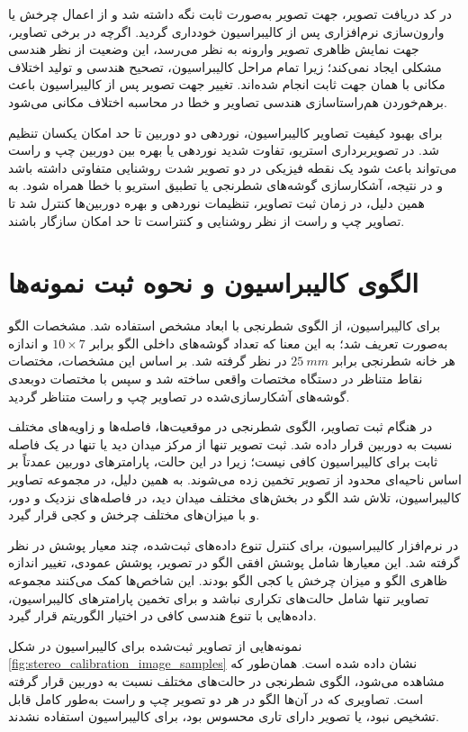 در کد دریافت تصویر، جهت تصویر به‌صورت ثابت نگه داشته شد و از اعمال چرخش یا وارون‌سازی نرم‌افزاری پس از کالیبراسیون خودداری گردید. اگرچه در برخی تصاویر، جهت نمایش ظاهری تصویر وارونه به نظر می‌رسد، این وضعیت از نظر هندسی مشکلی ایجاد نمی‌کند؛ زیرا تمام مراحل کالیبراسیون، تصحیح هندسی و تولید اختلاف مکانی با همان جهت ثابت انجام شده‌اند. تغییر جهت تصویر پس از کالیبراسیون باعث برهم‌خوردن هم‌راستاسازی هندسی تصاویر و خطا در محاسبه اختلاف مکانی می‌شود.

برای بهبود کیفیت تصاویر کالیبراسیون، نوردهی دو دوربین تا حد امکان یکسان تنظیم شد. در تصویربرداری استریو، تفاوت شدید نوردهی یا بهره بین دوربین چپ و راست می‌تواند باعث شود یک نقطه فیزیکی در دو تصویر شدت روشنایی متفاوتی داشته باشد و در نتیجه، آشکارسازی گوشه‌های شطرنجی یا تطبیق استریو با خطا همراه شود. به همین دلیل، در زمان ثبت تصاویر، تنظیمات نوردهی و بهره دوربین‌ها کنترل شد تا تصاویر چپ و راست از نظر روشنایی و کنتراست تا حد امکان سازگار باشند.

\section{الگوی کالیبراسیون و نحوه ثبت نمونه‌ها}
\label{app:stereo_calibration_board_capture}

برای کالیبراسیون، از الگوی شطرنجی با ابعاد مشخص استفاده شد. مشخصات الگو به‌صورت  تعریف شد؛ به این معنا که تعداد گوشه‌های داخلی الگو برابر $10 \times 7$ و اندازه هر خانه شطرنجی برابر $25~mm$ در نظر گرفته شد. بر اساس این مشخصات، مختصات نقاط متناظر در دستگاه مختصات واقعی ساخته شد و سپس با مختصات دوبعدی گوشه‌های آشکارسازی‌شده در تصاویر چپ و راست متناظر گردید.

در هنگام ثبت تصاویر، الگوی شطرنجی در موقعیت‌ها، فاصله‌ها و زاویه‌های مختلف نسبت به دوربین قرار داده شد. ثبت تصویر تنها از مرکز میدان دید یا تنها در یک فاصله ثابت برای کالیبراسیون کافی نیست؛ زیرا در این حالت، پارامترهای دوربین عمدتاً بر اساس ناحیه‌ای محدود از تصویر تخمین زده می‌شوند. به همین دلیل، در مجموعه تصاویر کالیبراسیون، تلاش شد الگو در بخش‌های مختلف میدان دید، در فاصله‌های نزدیک و دور، و با میزان‌های مختلف چرخش و کجی قرار گیرد.

در نرم‌افزار کالیبراسیون، برای کنترل تنوع داده‌های ثبت‌شده، چند معیار پوشش در نظر گرفته شد. این معیارها شامل پوشش افقی الگو در تصویر، پوشش عمودی، تغییر اندازه ظاهری الگو و میزان چرخش یا کجی الگو بودند. این شاخص‌ها کمک می‌کنند مجموعه تصاویر تنها شامل حالت‌های تکراری نباشد و برای تخمین پارامترهای کالیبراسیون، داده‌هایی با تنوع هندسی کافی در اختیار الگوریتم قرار گیرد.

نمونه‌هایی از تصاویر ثبت‌شده برای کالیبراسیون در شکل \ref{fig:stereo_calibration_image_samples} نشان داده شده است. همان‌طور که مشاهده می‌شود، الگوی شطرنجی در حالت‌های مختلف نسبت به دوربین قرار گرفته است. تصاویری که در آن‌ها الگو در هر دو تصویر چپ و راست به‌طور کامل قابل تشخیص نبود، یا تصویر دارای تاری محسوس بود، برای کالیبراسیون استفاده نشدند.

